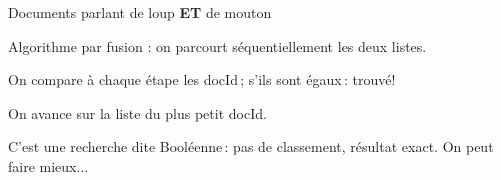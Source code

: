 \begin{frame}{Documents parlant de \alert{loup} {\bf ET} de \alert{mouton}}


Algorithme par \alert{fusion} : on parcourt \alert{séquentiellement} les deux listes.

\vfill

On compare à chaque étape les docId\,; s'ils sont égaux\,: \alert{trouvé}!

\vfill

On avance sur la liste du plus petit docId.

\vfill


\pause


\vfill

\begin{blocgauche}
C'est une recherche dite \alert{Booléenne}\,: pas de classement, résultat exact. 
On peut faire mieux...
\end{blocgauche}
\end{frame}

